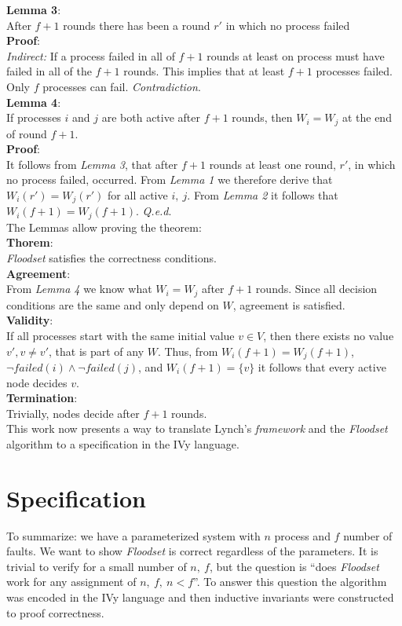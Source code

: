 \documentclass[fleqn]{article}
\begin{document}
\noindent \textbf{Lemma 3}:\\
After $f+1$ rounds there has been a round $r'$ in which no process failed\\
\textbf{Proof}:\\
\textit{Indirect:} If a process failed in all of $f+1$ rounds at least on process must have failed in all of the $f+1$ rounds. This implies
that at least $f+1$ processes failed. Only $f$ processes can fail. \textit{Contradiction}.\\


\noindent \textbf{Lemma 4}:\\
If processes $i$ and $j$ are both active after $f+1$ rounds, then $W_i = W_j$ at the end of round $f + 1$.\\
\textbf{Proof}:\\
It follows from \textit{Lemma 3}, that after $f+1$ rounds at least one round, $r'$, in which no process failed, occurred. From \textit{Lemma 1} we therefore derive that $W_i(r') = W_j(r')$ for all active $i,\ j$.
From \textit{Lemma 2} it follows that $W_i(f+1) = W_j(f+1)$. \textit{Q.e.d}.\\

\noindent The Lemmas allow proving the theorem:\\
\noindent \textbf{Thorem}:\\
\textit{Floodset} satisfies the correctness conditions.\\
\textbf{Agreement}:\\
From \textit{Lemma 4} we know what $W_i = W_j$ after $f+1$ rounds. Since all decision conditions are the same and only depend on $W$, agreement is satisfied.\\
\textbf{Validity}:\\
If all processes start with the same initial value $v \in V$, then there exists no value $v', v \neq v'$, that is part of any $W$. Thus, from $W_i(f+1) = W_j(f+1)$, $\neg failed(i) \land \neg failed(j)$, and $W_i(f+1) = \{v\}$ it follows
that every active node decides $v$.\\
\textbf{Termination}:\\
Trivially, nodes decide after $f+1$ rounds.\\

This work now presents a way to translate Lynch's \textit{framework} and the \textit{Floodset} algorithm to a specification in the IVy language.

\section{Specification}
To summarize: we have a parameterized system with $n$ process and $f$ number of faults. We want to show \textit{Floodset} is correct regardless of the parameters.
It is trivial to verify for a small number of $n,\ f$, but the question is ``does \textit{Floodset} work for any assignment of $n,\ f,\ n < f$''.
To answer this question the algorithm was encoded in the IVy language and then inductive invariants were constructed to proof correctness.
\end{document}
